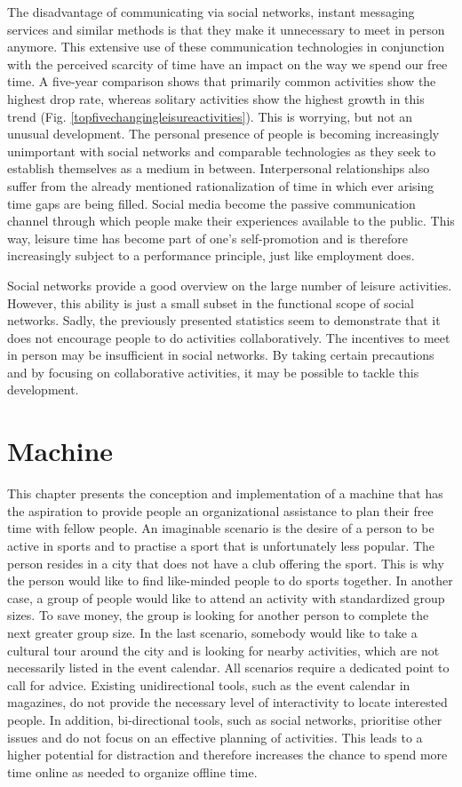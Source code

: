 \documentclass[12pt,numbers=noenddot,parskip,bibliography=totocnumbered,listof=totocnumbered,draft]{scrreprt}
\begin{document}
The disadvantage of communicating via social networks, instant messaging services and similar methods is that they make it unnecessary to meet in person anymore. This extensive use of these communication technologies in conjunction with the perceived scarcity of time have an impact on the way we spend our free time. A five-year comparison shows that primarily common activities show the highest drop rate, whereas solitary activities show the highest growth in this trend (Fig. \ref{topfivechangingleisureactivities}). This is worrying, but not an unusual development. The personal presence of people is becoming increasingly unimportant with social networks and comparable technologies as they seek to establish themselves as a medium in between. Interpersonal relationships also suffer from the already mentioned rationalization of time in which ever arising time gaps are being filled. Social media become the passive communication channel through which people make their experiences available to the public. This way, leisure time has become part of one's self-promotion and is therefore increasingly subject to a performance principle, just like employment does.

Social networks provide a good overview on the large number of leisure activities. However, this ability is just a small subset in the functional scope of social networks. Sadly, the previously presented statistics seem to demonstrate that it does not encourage people to do activities collaboratively. The incentives to meet in person may be insufficient in social networks. By taking certain precautions and by focusing on collaborative activities, it may be possible to tackle this development.

\chapter{Machine}
This chapter presents the conception and implementation of a machine that has the aspiration to provide people an organizational assistance to plan their free time with fellow people. An imaginable scenario is the desire of a person to be active in sports and to practise a sport that is unfortunately less popular. The person resides in a city that does not have a club offering the sport. This is why the person would like to find like-minded people to do sports together. In another case, a group of people would like to attend an activity with standardized group sizes. To save money, the group is looking for another person to complete the next greater group size. In the last scenario, somebody would like to take a cultural tour around the city and is looking for nearby activities, which are not necessarily listed in the event calendar. All scenarios require a dedicated point to call for advice. Existing unidirectional tools, such as the event calendar in magazines, do not provide the necessary level of interactivity to locate interested people. In addition, bi-directional tools, such as social networks, prioritise other issues and do not focus on an effective planning of activities. This leads to a higher potential for distraction and therefore increases the chance to spend more time online as needed to organize offline time.
\end{document}
